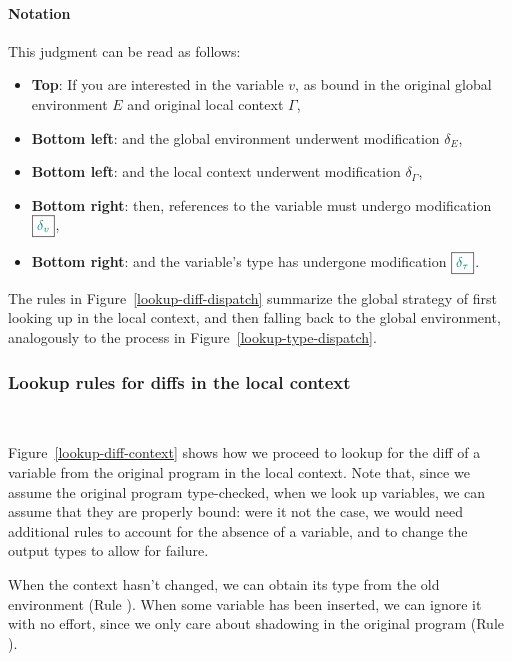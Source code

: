 \paragraph{Notation} This judgment can be read as follows:
\begin{itemize}

\item \textbf{Top}: If you are interested in the variable $v$, as bound in the
original global environment $E$ and original local context $\Gamma$,

\item \textbf{Bottom left}: and the global environment underwent modification
$\delta_{E}$,

\item \textbf{Bottom left}: and the local context underwent modification
$\delta_{\Gamma}$,

\item \textbf{Bottom right}: then, references to the variable must undergo
modification $\boxed{ \textcolor{teal}{\delta_{v}} }$,

\item \textbf{Bottom right}: and the variable's type has undergone modification
$\boxed{ \textcolor{teal}{\delta_{\tau}} }$.

\end{itemize}

The rules in Figure~\ref{lookup-diff-dispatch} summarize the global strategy of
first looking up in the local context, and then falling back to the global
environment, analogously to the process in Figure~\ref{lookup-type-dispatch}.



\subsubsection{Lookup rules for diffs in the local
context}~\label{chick-lookup-diff-context}



Figure~\ref{lookup-diff-context} shows how we proceed to lookup for the diff of
a variable from the original program in the local context.  Note that, since we
assume the original program type-checked, when we look up variables, we can
assume that they are properly bound: were it not the case, we would need
additional rules to account for the absence of a variable, and to change the
output types to allow for failure.

When the context hasn't changed, we can obtain its type from the old environment
(Rule ).  When some variable has been inserted, we can
ignore it with no effort, since we only care about shadowing in the original
program (Rule ).

